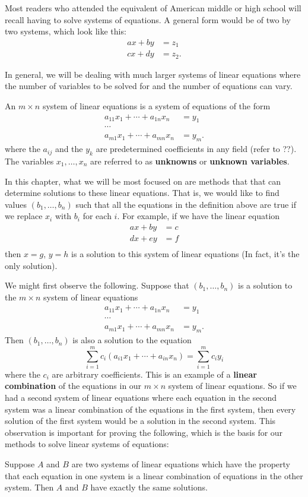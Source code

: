Most readers who attended the equivalent of American middle or high school will recall having to solve systems of equations. A general form would be of two by two systems, which look like this:
\begin{align*}
ax + by &= z_1 \\
cx + dy &= z_2.
\end{align*}

In general, we will be dealing with much larger systems of linear equations where the number of variables to be solved for and the number of equations can vary.

\begin{definition}
An $m \times n$ system of linear equations is a system of equations of the form
\begin{align*}
a_{11}x_1 + \cdots + a_{1n}x_n &= y_1 \\
\cdots \\
a_{m1}x_1 + \cdots + a_{mn}x_n &= y_m.
\end{align*}
where the $a_{ij}$ and the $y_k$ are predetermined coefficients in any field (refer to ??). The variables $x_1, \dots, x_n$ are referred to as \textbf{unknowns} or \textbf{unknown variables}. 
\end{definition}

In this chapter, what we will be most focused on are methods that that can determine solutions to these linear equations. That is, we would like to find values $(b_1, \dots, b_n)$ such that all the equations in the definition above are true if we replace $x_i$ with $b_i$ for each $i$. For example, if we have the linear equation 
\begin{align*}
ax + by &= c \\
dx + ey &= f \\
\end{align*}
then $x = g$, $y = h$ is a solution to this system of linear equations (In fact, it's the only solution).

We might first observe the following. Suppose that $(b_1, \dots, b_n)$ is a solution to the $m \times n$ system of linear equations
\begin{align*}
a_{11}x_1 + \cdots + a_{1n}x_n &= y_1 \\
\cdots \\
a_{m1}x_1 + \cdots + a_{mn}x_n &= y_m.
\end{align*}
Then $(b_1, \dots, b_n)$ is also a solution to the equation 
\[\sum_{i = 1}^mc_i(a_{i1}x_1 + \cdots + a_{in}x_n) = \sum_{i = 1}^mc_iy_i\]
where the $c_i$ are arbitrary coefficients. This is an example of a \textbf{linear combination} of the equations in our $m \times n$ system of linear equations. So if we had a second system of linear equations where each equation in the second system was a linear combination of the equations in the first system, then every solution of the first system would be a solution in the second system. This observation is important for proving the following, which is the basis for our methods to solve linear systems of equations:

\begin{theorem}
Suppose $A$ and $B$ are two systems of linear equations which have the property that each equation in one system is a linear combination of equations in the other system. Then $A$ and $B$ have exactly the same solutions.
\end{theorem}

